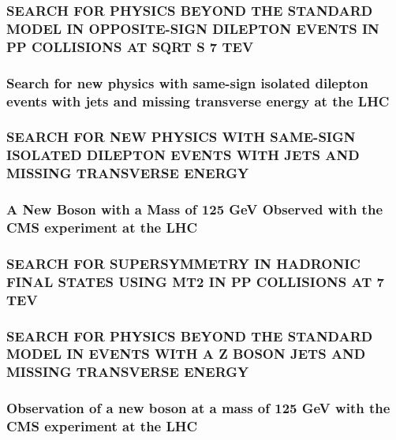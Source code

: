\documentclass[a4paper, 11pt, twoside, openright]{report}
\begin{document}
\subsubsection{SEARCH FOR PHYSICS BEYOND THE STANDARD MODEL IN OPPOSITE-SIGN DILEPTON EVENTS IN PP COLLISIONS AT SQRT S 7 TEV}
%
\subsubsection{Search for new physics with same-sign isolated dilepton events with jets and missing transverse energy at the LHC}
%
\subsubsection{SEARCH FOR NEW PHYSICS WITH SAME-SIGN ISOLATED DILEPTON EVENTS WITH JETS AND MISSING TRANSVERSE ENERGY}
%
\subsubsection{A New Boson with a Mass of 125 GeV Observed with the CMS experiment at the LHC}
%
\subsubsection{SEARCH FOR SUPERSYMMETRY IN HADRONIC FINAL STATES USING MT2 IN PP COLLISIONS AT 7 TEV}
%
\subsubsection{SEARCH FOR PHYSICS BEYOND THE STANDARD MODEL IN EVENTS WITH A Z BOSON JETS AND MISSING TRANSVERSE ENERGY}
%
\subsubsection{Observation of a new boson at a mass of 125 GeV with the CMS experiment at the LHC}
%
\end{document}
